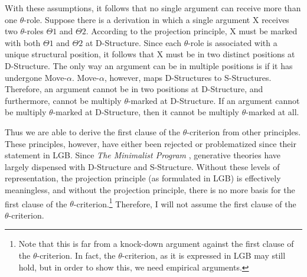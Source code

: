 \documentclass[MilwayThesis]{subfiles}
\begin{document}
With these assumptions, it follows that no single argument can receive more than one $\theta$-role.
Suppose there is a derivation in which a single argument X receives two $\theta$-roles $\Theta1$ and $\Theta2$.
According to the projection principle, X must be marked with both $\Theta1$ and $\Theta2$ at D-Structure.
Since each $\theta$-role is associated with a unique structural position, it follows that X must be in two distinct positions at D-Structure.
The only way an argument can be in multiple positions is if it has undergone Move-$\alpha$.
Move-$\alpha$, however, maps D-Structures to S-Structures.
Therefore, an argument cannot be in two positions at D-Structure, and furthermore, cannot be multiply $\theta$-marked at D-Structure.
If an argument cannot be multiply $\theta$-marked at D-Structure, then it cannot be multiply $\theta$-marked at all.

Thus we are able to derive the first clause of the $\theta$-criterion from other principles.
These principles, however, have either been rejected or problematized since their statement in LGB.
Since \textit{The Minimalist Program} \parencite{chomsky1995minimalist}, generative theories have largely dispensed with D-Structure and S-Structure.
Without these levels of representation, the projection principle (as formulated in LGB) is effectively meaningless, and without the projection principle, there is no more basis for the first clause of the $\theta$-criterion.\footnote{
	Note that this is far from a knock-down argument against the first clause of the $\theta$-criterion.
	In fact, the $\theta$-criterion, as it is expressed in LGB may still hold, but in order to show this, we need empirical arguments.
}
Therefore, I will not assume the first clause of the $\theta$-criterion.
\end{document}
